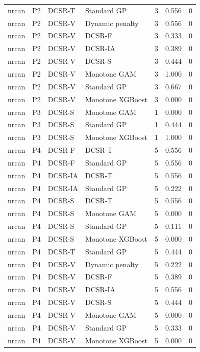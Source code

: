 \begin{tabular}{llllrrr}
nrcan & P2 & DCSR-T & Standard GP & 3 & 0.556 & 0 \\
nrcan & P2 & DCSR-V & Dynamic penalty & 3 & 0.556 & 0 \\
nrcan & P2 & DCSR-V & DCSR-F & 3 & 0.333 & 0 \\
nrcan & P2 & DCSR-V & DCSR-IA & 3 & 0.389 & 0 \\
nrcan & P2 & DCSR-V & DCSR-S & 3 & 0.444 & 0 \\
nrcan & P2 & DCSR-V & Monotone GAM & 3 & 1.000 & 0 \\
nrcan & P2 & DCSR-V & Standard GP & 3 & 0.667 & 0 \\
nrcan & P2 & DCSR-V & Monotone XGBoost & 3 & 0.000 & 0 \\
nrcan & P3 & DCSR-S & Monotone GAM & 1 & 0.000 & 0 \\
nrcan & P3 & DCSR-S & Standard GP & 1 & 0.444 & 0 \\
nrcan & P3 & DCSR-S & Monotone XGBoost & 1 & 1.000 & 0 \\
nrcan & P4 & DCSR-F & DCSR-T & 5 & 0.556 & 0 \\
nrcan & P4 & DCSR-F & Standard GP & 5 & 0.556 & 0 \\
nrcan & P4 & DCSR-IA & DCSR-T & 5 & 0.556 & 0 \\
nrcan & P4 & DCSR-IA & Standard GP & 5 & 0.222 & 0 \\
nrcan & P4 & DCSR-S & DCSR-T & 5 & 0.556 & 0 \\
nrcan & P4 & DCSR-S & Monotone GAM & 5 & 0.000 & 0 \\
nrcan & P4 & DCSR-S & Standard GP & 5 & 0.111 & 0 \\
nrcan & P4 & DCSR-S & Monotone XGBoost & 5 & 0.000 & 0 \\
nrcan & P4 & DCSR-T & Standard GP & 5 & 0.444 & 0 \\
nrcan & P4 & DCSR-V & Dynamic penalty & 5 & 0.222 & 0 \\
nrcan & P4 & DCSR-V & DCSR-F & 5 & 0.389 & 0 \\
nrcan & P4 & DCSR-V & DCSR-IA & 5 & 0.556 & 0 \\
nrcan & P4 & DCSR-V & DCSR-S & 5 & 0.444 & 0 \\
nrcan & P4 & DCSR-V & Monotone GAM & 5 & 0.000 & 0 \\
nrcan & P4 & DCSR-V & Standard GP & 5 & 0.333 & 0 \\
nrcan & P4 & DCSR-V & Monotone XGBoost & 5 & 0.000 & 0 \\
\bottomrule
\end{tabular}

